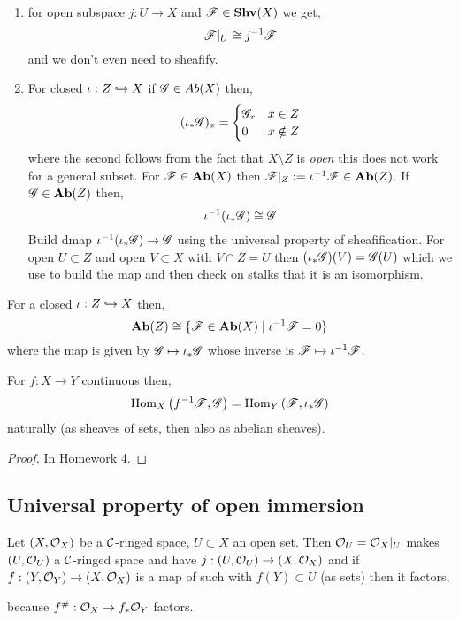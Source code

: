 \documentclass[12pt]{article}
\begin{document}
\begin{enumerate}
\item for open subspace $j : U \to X$ and $\mathscr{F} \in \mathbf{Shv}(X)$ we get,
\[ \mathscr{F}|_U \cong j^{-1} \mathscr{F} \]
and we don't even need to sheafify.
\item For closed $\iota : Z \hookrightarrow X$ if $\mathscr{G} \in Ab(X)$ then,
\[ (\iota_* \mathscr{G})_x = 
\begin{cases}
\mathscr{G}_x & x \in Z
\\
0 & x \notin Z
\end{cases} \]
where the second follows from the fact that $X \setminus Z$ is \textit{open} this does not work for a general subset. For $\mathscr{F} \in \mathbf{Ab}(X)$ then $\mathscr{F}|_Z := \iota^{-1} \mathscr{F} \in \mathbf{Ab}(Z)$. If $\mathscr{G} \in \mathbf{Ab}(Z)$ then,
\[ \iota^{-1} (\iota_* \mathscr{G}) \cong \mathscr{G} \]
Build dmap $\iota^{-1} (\iota_* \mathscr{G}) \to \mathscr{G}$ using the universal property of sheafification. For open $U \subset Z$ and open $V \subset X$ with $V \cap Z = U$ then $(\iota_* \mathscr{G})(V) = \mathscr{G}(U)$ which we use to build the map and then check on stalks that it is an isomorphism. 
\end{enumerate}

\begin{cor}
For a closed $\iota : Z \hookrightarrow X$ then,
\[ \mathbf{Ab}(Z) \cong \{ \mathscr{F} \in \mathbf{Ab}(X) \mid \iota^{-1} \mathscr{F} = 0 \} \]
where the map is given by $\mathscr{G} \mapsto \iota_* \mathscr{G}$ whose inverse is $\mathscr{F} \mapsto \iota^{-1} \mathscr{F}$. 
\end{cor}

\begin{prop}
For $f : X \to Y$ continuous then,
\[ \mathrm{Hom}_{X} \left( f^{-1} \mathscr{F}, \mathscr{G} \right) = \mathrm{Hom}_{Y} \left( \mathscr{F}, \iota_* \mathscr{G} \right) \]
naturally (as sheaves of sets, then also as abelian sheaves).
\end{prop}

\begin{proof}
In Homework 4.
\end{proof}

\subsection{Universal property of open immersion}

Let $(X, \mathcal{O}_{X})$ be a $\mathcal{C}$-ringed space, $U \subset X$ an open set. Then $\mathcal{O}_{U} = \mathcal{O}_{X}|_U$ makes $(U, \mathcal{O}_{U})$ a $\mathcal{C}$-ringed space and have $j : (U, \mathcal{O}_{U}) \to (X, \mathcal{O}_{X})$ and if $f : (Y, \mathcal{O}_{Y}) \to (X, \mathcal{O}_{X})$ is a map of such with $f(Y) \subset U$ (as sets) then it factors,
\begin{center}
\end{center}
because $f^\# : \mathcal{O}_{X} \to f_* \mathcal{O}_{Y}$ factors.
\end{document}
